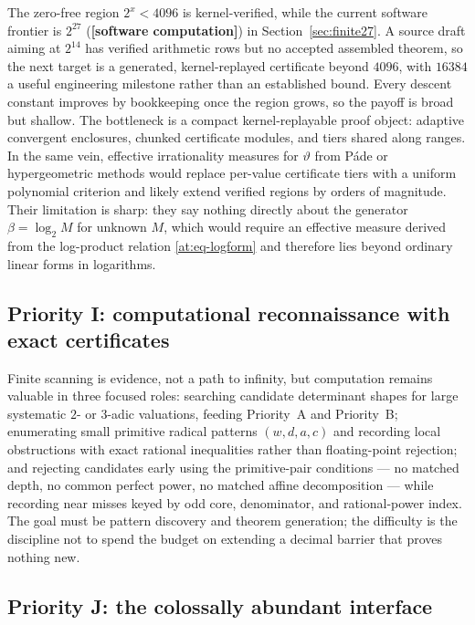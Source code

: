 \documentclass[11pt,oneside]{article}
\theoremstyle{definition}
\theoremstyle{remark}
\newcommand{\thetaq}{\vartheta}
\newcommand{\statuscomp}{\textcolor{computeviolet}{\textbf{[software computation]}}}
\begin{document}
The zero-free region $2^{x}<4096$ is kernel-verified, while the current software frontier is
$2^{27}$ (\statuscomp{}) in Section~\ref{sec:finite27}.  A source draft aiming at $2^{14}$
has verified arithmetic rows but no accepted assembled theorem, so the next target is a
generated, kernel-replayed certificate beyond $4096$, with $16384$ a useful engineering
milestone rather than an established bound.  Every descent constant
improves by bookkeeping once the region grows, so the payoff is broad but shallow.  The
bottleneck is a compact kernel-replayable proof object: adaptive convergent enclosures,
chunked certificate modules, and tiers shared along ranges.  In the same vein, effective
irrationality measures for $\thetaq$ from P\'ade or hypergeometric methods would replace
per-value certificate tiers with a uniform polynomial criterion and likely extend verified
regions by orders of magnitude.  Their limitation is sharp: they say nothing directly about
the generator $\beta=\log_2M$ for unknown $M$, which would require an effective measure
derived from the log-product relation \eqref{at:eq-logform} and therefore lies beyond
ordinary linear forms in logarithms.

\subsection{Priority I: computational reconnaissance with exact certificates}
\label{at:prog-compute}

Finite scanning is evidence, not a path to infinity, but computation remains valuable in
three focused roles: searching candidate determinant shapes for large systematic $2$- or
$3$-adic valuations, feeding Priority~A and Priority~B; enumerating small primitive radical
patterns $(w,d,a,c)$ and recording local obstructions with exact rational inequalities
rather than floating-point rejection; and rejecting candidates early using the primitive-pair
conditions --- no matched depth, no common perfect power, no matched affine decomposition ---
while recording near misses keyed by odd core, denominator, and rational-power index.  The
goal must be pattern discovery and theorem generation; the difficulty is the discipline not
to spend the budget on extending a decimal barrier that proves nothing new.

\subsection{Priority J: the colossally abundant interface}
\label{at:prog-ca}
\end{document}
